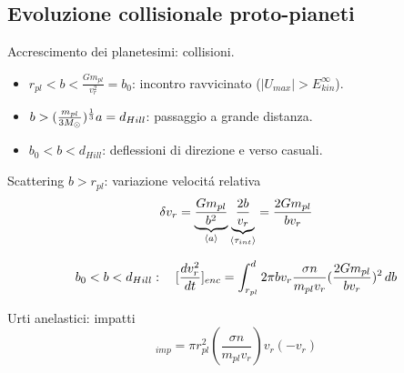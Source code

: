 \subsection{Evoluzione collisionale proto-pianeti}

\begin{frame}{Accrescimento dei planetesimi: collisioni.}
\begin{itemize}
\item $r_{pl}<b<\frac{Gm_{pl}}{v_r^2}=b_0$: incontro ravvicinato ($|U_{max}|>E_{kin}^{\infty}$).
\item $b>(\frac{m_{pl}}{3\msun{}})\expy{\frac{1}{3}}a=d_{Hill}$: passaggio a grande distanza.
\item $b_0<b<d_{Hill}$: deflessioni di direzione e verso casuali.
\end{itemize}
\begin{block}{Scattering $b>r_{pl}$: variazione velocit\'a relativa}
\begin{equation*}
\delta v_r=\underbrace{\frac{Gm_{pl}}{b^2}}_{\exv{a}}\underbrace{\frac{2b}{v_r}}_{\exv{\tau_{int}}}=\frac{2Gm_{pl}}{bv_r}
\end{equation*}
\end{block}
\begin{equation*}
b_0<b<d_{Hill}:\quad [\TDy{t}{v_r^2}]_{enc}=\int_{r_{pl}}^d2\pi bv_r\frac{\sigma n}{m_{pl}v_r}(\frac{2Gm_{pl}}{bv_r})^2\,db
\end{equation*}
\begin{block}{Urti anelastici: impatti}
\begin{equation*}
[\TDy{t}{v_r^2}]_{imp}=\pi r_{pl}^2(\frac{\sigma n}{m_{pl}v_r})v_r(-v_r)
\end{equation*}
\end{block}
\end{frame}

